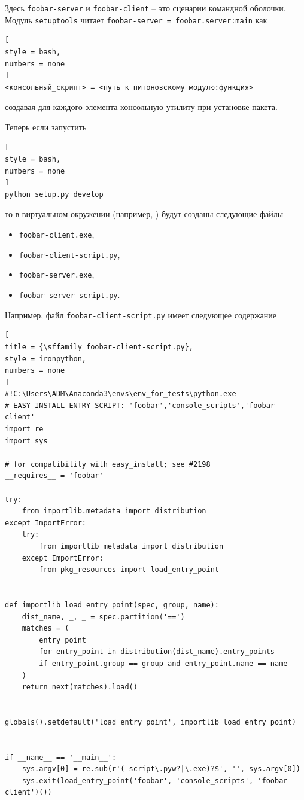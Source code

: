 \documentclass[%
	11pt,
	a4paper,
	utf8,
		]{article}
\begin{document}
Здесь \texttt{foobar-server} и \texttt{foobar-client} -- это сценарии командной оболочки. Модуль \texttt{setuptools} читает \texttt{foobar-server = foobar.server:main} как 
\begin{lstlisting}[
style = bash,
numbers = none	
]
<консольный_скрипт> = <путь к питоновскому модулю:функция>
\end{lstlisting}
создавая для каждого элемента консольную утилиту при установке пакета.

Теперь если запустить
\begin{lstlisting}[
style = bash,
numbers = none	
]
python setup.py develop
\end{lstlisting}
то в виртуальном окружении (например, ) будут созданы следующие файлы
\begin{itemize}
	\item \texttt{foobar-client.exe},
	
	\item \texttt{foobar-client-script.py},
	
	\item \texttt{foobar-server.exe},
	
	\item \texttt{foobar-server-script.py}.
\end{itemize}

Например, файл \texttt{foobar-client-script.py} имеет следующее содержание
\begin{lstlisting}[
title = {\sffamily foobar-client-script.py},
style = ironpython,
numbers = none	
]
#!C:\Users\ADM\Anaconda3\envs\env_for_tests\python.exe
# EASY-INSTALL-ENTRY-SCRIPT: 'foobar','console_scripts','foobar-client'
import re
import sys

# for compatibility with easy_install; see #2198
__requires__ = 'foobar'

try:
    from importlib.metadata import distribution
except ImportError:
    try:
        from importlib_metadata import distribution
    except ImportError:
        from pkg_resources import load_entry_point


def importlib_load_entry_point(spec, group, name):
    dist_name, _, _ = spec.partition('==')
    matches = (
        entry_point
        for entry_point in distribution(dist_name).entry_points
        if entry_point.group == group and entry_point.name == name
    )
    return next(matches).load()


globals().setdefault('load_entry_point', importlib_load_entry_point)


if __name__ == '__main__':
    sys.argv[0] = re.sub(r'(-script\.pyw?|\.exe)?$', '', sys.argv[0])
    sys.exit(load_entry_point('foobar', 'console_scripts', 'foobar-client')())
\end{lstlisting}
\end{document}
